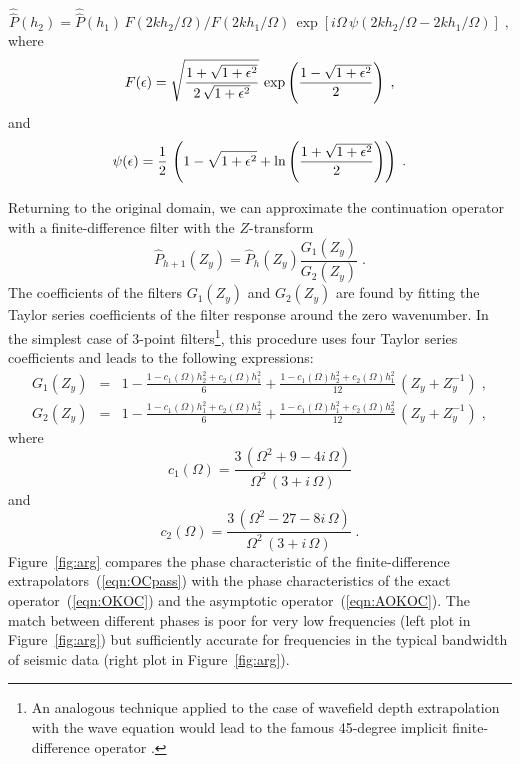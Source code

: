 \begin{equation}
\widehat{\widehat{P}}(h_2) = \widehat{\widehat{P}}(h_1)\,
F(2 k h_2/\Omega)/F(2 k h_1/\Omega)\,
\exp{\left[i\Omega\,\psi\left(2 k h_2/\Omega - 2 k h_1/\Omega\right)\right]}\;,
\label{eqn:AOKOC}
\end{equation}
where
\begin{equation}
F(\epsilon)=\sqrt{{1+\sqrt{1+\epsilon^2}} \over
{2\,\sqrt{1+\epsilon^2}}}\,
\exp\left({1-\sqrt{1+\epsilon^2}} \over 2\right)\;,
\label{eqn:F}
\end{equation}
and
\begin{equation}
\psi(\epsilon)={1 \over 2}\,\left(1 - \sqrt{1+\epsilon^2} +
\ln\left({1 + \sqrt{1+\epsilon^2}} \over 2\right)\right)\;.
\label{eqn:psi}
\end{equation}

Returning to the original domain, we can approximate the continuation
operator with a finite-difference filter with the $Z$-transform
\begin{equation}
\label{eqn:OCpass}
\hat{P}_{h+1}(Z_y) = \hat{P}_{h} (Z_y) \frac{G_1(Z_y)}{G_2(Z_y)}\;.
\end{equation}
The coefficients of the filters $G_1(Z_y)$ and $G_2(Z_y)$ are found by
fitting the Taylor series coefficients of the filter response around
the zero wavenumber.  In the simplest case of 3-point
filters\footnote{An analogous technique applied to the case of
  wavefield depth extrapolation with the wave equation would lead to
  the famous 45-degree implicit finite-difference operator
  \cite[]{Claerbout.blackwell.85}.}, this procedure uses four Taylor
series coefficients and leads to the following expressions:
\begin{eqnarray}
  \label{eqn:OCnum}
  G_1(Z_y) & = & 1 - \frac{1 - c_1(\Omega) h_2^2 + c_2(\Omega) h_1^2}{6} +
  \frac{1 - c_1(\Omega) h_2^2 + c_2(\Omega) h_1^2}{12}\,
  \left(Z_y + Z_y^{-1}\right)\;, \\
  \label{eqn:OCden}
  G_2(Z_y) & = & 1 - \frac{1 - c_1(\Omega) h_1^2 + c_2(\Omega) h_2^2}{6} +
  \frac{1 - c_1(\Omega) h_1^2 + c_2(\Omega) h_2^2}{12}\,
  \left(Z_y + Z_y^{-1}\right)\;,
\end{eqnarray}
where 
\[
c_1(\Omega) = \frac{3\,(\Omega^2 + 9 - 4
  i\,\Omega)}{\Omega^2\,(3+i\,\Omega)}
\]
and 
\[
c_2(\Omega) =
\frac{3\,(\Omega^2 - 27 - 8 i\,\Omega)}{\Omega^2\,(3+i\,\Omega)}\;.
\]
Figure~\ref{fig:arg} compares the phase characteristic of the
finite-difference extrapolators~(\ref{eqn:OCpass}) with the phase
characteristics of the exact operator~(\ref{eqn:OKOC}) and the
asymptotic operator~(\ref{eqn:AOKOC}). The match between different
phases is poor for very low frequencies (left plot in
Figure~\ref{fig:arg}) but sufficiently accurate for frequencies in the
typical bandwidth of seismic data (right plot in
Figure~\ref{fig:arg}).

